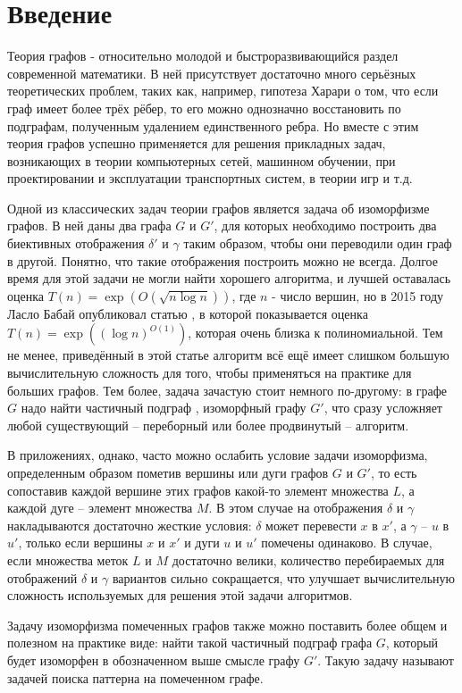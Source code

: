 \section{Введение}
Теория графов - относительно молодой и быстроразвивающийся раздел современной математики. В ней присутствует достаточно много серьёзных теоретических проблем, таких как, например, гипотеза Харари\cite{harari} о том, что если граф имеет более трёх рёбер, то его можно однозначно восстановить по подграфам, полученным удалением единственного ребра. Но вместе с этим теория графов успешно применяется для решения прикладных задач, возникающих в теории компьютерных сетей, машинном обучении, при проектировании и эксплуатации транспортных систем, в теории игр и т.д.

Одной из классических задач теории графов является задача об изоморфизме графов. В ней даны два графа $G$ и $G'$, для которых необходимо построить два биективных отображения $\delta'$ и $\gamma$ таким образом, чтобы они переводили один граф в другой. Понятно, что такие отображения построить можно не всегда. Долгое время для этой задачи не могли найти хорошего алгоритма, и лучшей оставалась оценка $T(n) = \exp(O(\sqrt{n \log n}))$, где $n$ - число вершин, но в 2015 году Ласло Бабай опубликовал статью \cite{izom}, в которой показывается оценка $T(n) = \exp((\log n)^{O(1)})$, которая очень близка к полиномиальной. Тем не менее, приведённый в этой статье алгоритм всё ещё имеет слишком большую вычислительную сложность для того, чтобы применяться на практике для больших графов. Тем более, задача зачастую стоит немного по-другому: в графе $G$ надо найти частичный подграф \cite{berzh}, изоморфный графу $G'$, что сразу усложняет любой существующий -- переборный или более продвинутый -- алгоритм.

В приложениях, однако, часто можно ослабить условие задачи изоморфизма, определенным образом пометив вершины или дуги графов $G$ и $G'$, то есть сопоставив каждой вершине этих графов какой-то элемент множества $L$, а каждой дуге -- элемент множества $M$. В этом случае на отображения $\delta$ и $\gamma$ накладываются достаточно жесткие условия: $\delta$ может перевести $x$ в $x'$, а $\gamma$ -- $u$ в $u'$, только если вершины $x$ и $x'$ и дуги $u$ и $u'$ помечены одинаково. В случае, если множества меток $L$ и $M$ достаточно велики, количество перебираемых для отображений $\delta$ и $\gamma$ вариантов сильно сокращается, что улучшает вычислительную сложность используемых для решения этой задачи алгоритмов. 

Задачу изоморфизма помеченных графов также можно поставить более общем и полезном на практике виде: найти такой частичный подграф графа $G$, который будет изоморфен в обозначенном выше смысле графу $G'$. Такую задачу называют задачей поиска паттерна на помеченном графе.

